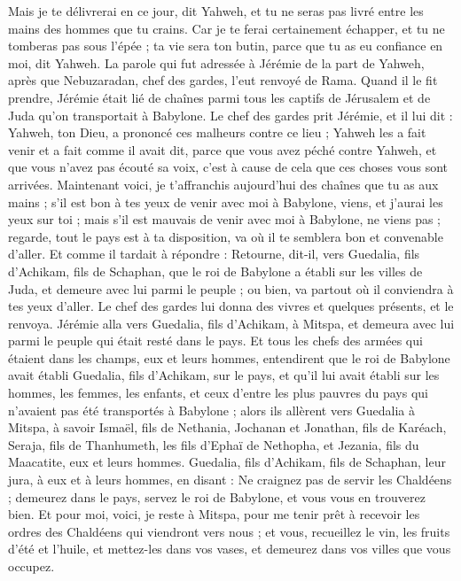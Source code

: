 \begin{multicols}{2}
Mais je te délivrerai en ce jour, dit Yahweh, et tu ne seras pas livré entre les mains des hommes que tu crains.
Car je te ferai certainement échapper, et tu ne tomberas pas sous l'épée ; ta vie sera ton butin, parce que tu as eu confiance en moi, dit Yahweh.
\VerseOne{}La parole qui fut adressée à Jérémie de la part de Yahweh, après que Nebuzaradan, chef des gardes, l'eut renvoyé de Rama. Quand il le fit prendre, Jérémie était lié de chaînes parmi tous les captifs de Jérusalem et de Juda qu'on transportait à Babylone.
Le chef des gardes prit Jérémie, et il lui dit : Yahweh, ton Dieu, a prononcé ces malheurs contre ce lieu ;
Yahweh les a fait venir et a fait comme il avait dit, parce que vous avez péché contre Yahweh, et que vous n'avez pas écouté sa voix, c'est à cause de cela que ces choses vous sont arrivées.
Maintenant voici, je t'affranchis aujourd'hui des chaînes que tu as aux mains ; s'il est bon à tes yeux de venir avec moi à Babylone, viens, et j'aurai les yeux sur toi ; mais s'il est mauvais de venir avec moi à Babylone, ne viens pas ; regarde, tout le pays est à ta disposition, va où il te semblera bon et convenable d'aller.
Et comme il tardait à répondre : Retourne, dit-il, vers Guedalia, fils d'Achikam, fils de Schaphan, que le roi de Babylone a établi sur les villes de Juda, et demeure avec lui parmi le peuple ; ou bien, va partout où il conviendra à tes yeux d'aller. Le chef des gardes lui donna des vivres et quelques présents, et le renvoya.
Jérémie alla vers Guedalia, fils d'Achikam, à Mitspa, et demeura avec lui parmi le peuple qui était resté dans le pays.
Et tous les chefs des armées qui étaient dans les champs, eux et leurs hommes, entendirent que le roi de Babylone avait établi Guedalia, fils d'Achikam, sur le pays, et qu'il lui avait établi sur les hommes, les femmes, les enfants, et ceux d'entre les plus pauvres du pays qui n'avaient pas été transportés à Babylone ;
alors ils allèrent vers Guedalia à Mitspa, à savoir Ismaël, fils de Nethania, Jochanan et Jonathan, fils de Karéach, Seraja, fils de Thanhumeth, les fils d'Ephaï de Nethopha, et Jezania, fils du Maacatite, eux et leurs hommes.
Guedalia, fils d'Achikam, fils de Schaphan, leur jura, à eux et à leurs hommes, en disant : Ne craignez pas de servir les Chaldéens ; demeurez dans le pays, servez le roi de Babylone, et vous vous en trouverez bien.
Et pour moi, voici, je reste à Mitspa, pour me tenir prêt à recevoir les ordres des Chaldéens qui viendront vers nous ; et vous, recueillez le vin, les fruits d'été et l'huile, et mettez-les dans vos vases, et demeurez dans vos villes que vous occupez.

\end{multicols}
